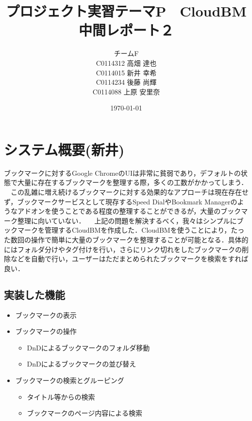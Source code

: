 \documentclass[a4paper,10pt,fleqn]{jsarticle}
\title{プロジェクト実習テーマP　CloudBM  中間レポート２}
\author{
  チームF　\\
  C0114312 高畑 達也\\
  C0114015 新井 幸希\\
  C0114234 後藤 尚輝\\
  C0114088 上原 安里奈\\
}
\date{\today}
\begin{document}
\maketitle

\section{システム概要(新井)}
ブックマークに対するGoogle ChromeのUIは非常に貧弱であり，デフォルトの状態で大量に存在するブックマークを整理する際，多くの工数がかかってしまう．
　この乱雑に増え続けるブックマークに対する効果的なアプローチは現在存在せず，ブックマークサービスとして現存するSpeed DialやBookmark Managerのようなアドオンを使うことである程度の整理することができるが，大量のブックマーク整理に向いていない．
　上記の問題を解決するべく，我々はシンプルにブックマークを管理するCloudBMを作成した．CloudBMを使うことにより，たった数回の操作で簡単に大量のブックマークを整理することが可能となる．具体的にはフォルダ分けやタグ付けを行い，さらにリンク切れをしたブックマークの削除などを自動で行い，ユーザーはただまとめられたブックマークを検索をすれば良い．
\subsection{実装した機能}
\begin{itemize}
\item ブックマークの表示
\item ブックマークの操作
\begin{itemize}
\item DnDによるブックマークのフォルダ移動
\item DnDによるブックマークの並び替え
\end{itemize}
\item ブックマークの検索とグルーピング
\begin{itemize}
\item タイトル等からの検索
\item ブックマークのページ内容による検索
\end{itemize}
\end{itemize}
\end{document}
